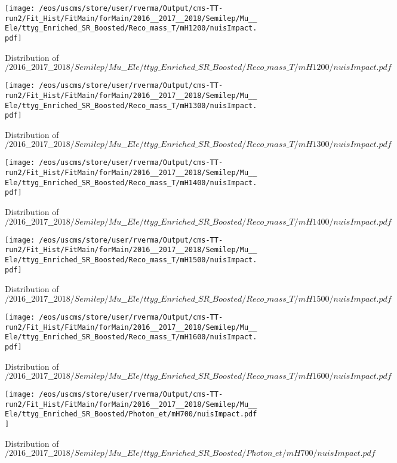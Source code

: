 \begin{figure}
\centering
\texttt{[image: /eos/uscms/store/user/rverma/Output/cms-TT-run2/Fit\_Hist/FitMain/forMain/2016\_\_2017\_\_2018/Semilep/Mu\_\_Ele/ttyg\_Enriched\_SR\_Boosted/Reco\_mass\_T/mH1200/nuisImpact.pdf]}
\caption{Distribution of $/2016\_\_2017\_\_2018/Semilep/Mu\_\_Ele/ttyg\_Enriched\_SR\_Boosted/Reco\_mass\_T/mH1200/nuisImpact.pdf$}
\end{figure}

\begin{figure}
\centering
\texttt{[image: /eos/uscms/store/user/rverma/Output/cms-TT-run2/Fit\_Hist/FitMain/forMain/2016\_\_2017\_\_2018/Semilep/Mu\_\_Ele/ttyg\_Enriched\_SR\_Boosted/Reco\_mass\_T/mH1300/nuisImpact.pdf]}
\caption{Distribution of $/2016\_\_2017\_\_2018/Semilep/Mu\_\_Ele/ttyg\_Enriched\_SR\_Boosted/Reco\_mass\_T/mH1300/nuisImpact.pdf$}
\end{figure}

\begin{figure}
\centering
\texttt{[image: /eos/uscms/store/user/rverma/Output/cms-TT-run2/Fit\_Hist/FitMain/forMain/2016\_\_2017\_\_2018/Semilep/Mu\_\_Ele/ttyg\_Enriched\_SR\_Boosted/Reco\_mass\_T/mH1400/nuisImpact.pdf]}
\caption{Distribution of $/2016\_\_2017\_\_2018/Semilep/Mu\_\_Ele/ttyg\_Enriched\_SR\_Boosted/Reco\_mass\_T/mH1400/nuisImpact.pdf$}
\end{figure}

\begin{figure}
\centering
\texttt{[image: /eos/uscms/store/user/rverma/Output/cms-TT-run2/Fit\_Hist/FitMain/forMain/2016\_\_2017\_\_2018/Semilep/Mu\_\_Ele/ttyg\_Enriched\_SR\_Boosted/Reco\_mass\_T/mH1500/nuisImpact.pdf]}
\caption{Distribution of $/2016\_\_2017\_\_2018/Semilep/Mu\_\_Ele/ttyg\_Enriched\_SR\_Boosted/Reco\_mass\_T/mH1500/nuisImpact.pdf$}
\end{figure}

\begin{figure}
\centering
\texttt{[image: /eos/uscms/store/user/rverma/Output/cms-TT-run2/Fit\_Hist/FitMain/forMain/2016\_\_2017\_\_2018/Semilep/Mu\_\_Ele/ttyg\_Enriched\_SR\_Boosted/Reco\_mass\_T/mH1600/nuisImpact.pdf]}
\caption{Distribution of $/2016\_\_2017\_\_2018/Semilep/Mu\_\_Ele/ttyg\_Enriched\_SR\_Boosted/Reco\_mass\_T/mH1600/nuisImpact.pdf$}
\end{figure}

\begin{figure}
\centering
\texttt{[image: /eos/uscms/store/user/rverma/Output/cms-TT-run2/Fit\_Hist/FitMain/forMain/2016\_\_2017\_\_2018/Semilep/Mu\_\_Ele/ttyg\_Enriched\_SR\_Boosted/Photon\_et/mH700/nuisImpact.pdf]}
\caption{Distribution of $/2016\_\_2017\_\_2018/Semilep/Mu\_\_Ele/ttyg\_Enriched\_SR\_Boosted/Photon\_et/mH700/nuisImpact.pdf$}
\end{figure}

